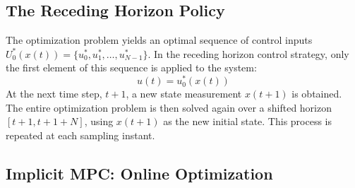\subsection{The Receding Horizon Policy}

The optimization problem yields an optimal sequence of control inputs $U_0^*(x(t)) = \{u_0^*, u_1^*, \dots, u_{N-1}^*\}$.
In the receding horizon control strategy, only the first element of this sequence is applied to the system:
\begin{equation}
    u(t) = u_0^*(x(t))
\end{equation}
At the next time step, $t+1$, a new state measurement $x(t+1)$ is obtained. The entire optimization problem is then solved again over a shifted horizon $[t+1, t+1+N]$, using $x(t+1)$ as the new initial state. This process is repeated at each sampling instant.


\subsection{Implicit MPC: Online Optimization}

